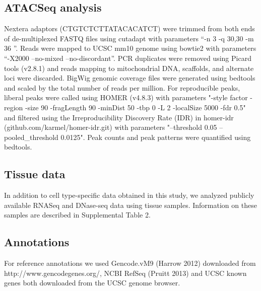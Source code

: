 \subsection{ATACSeq analysis}
Nextera adaptors (CTGTCTCTTATACACATCT) were trimmed from both ends of de-multiplexed FASTQ files using cutadapt with parameters “-n 3 -q 30,30 -m 36 ”. Reads were mapped to UCSC mm10 genome using bowtie2 with parameters “-X2000 --no-mixed --no-discordant”. PCR duplicates were removed using Picard tools (v2.8.1) and reads mapping to mitochondrial DNA, scaffolds, and alternate loci were discarded. BigWig genomic coverage files were generated using bedtools and scaled by the total number of reads per million. For reproducible peaks, liberal peaks were called using HOMER (v4.8.3) with parameters "-style factor -region -size 90 -fragLength 90 -minDist 50 -tbp 0 -L 2 -localSize 5000 -fdr 0.5" and filtered using the Irreproducibility Discovery Rate (IDR) in homer-idr (github.com/karmel/homer-idr.git) with parameters "--threshold 0.05 --pooled_threshold 0.0125". Peak counts and peak patterns were quantified using bedtools.

\subsection{Tissue data}
In addition to cell type-specific data obtained in this study, we analyzed publicly available RNASeq and DNase-seq data using tissue samples. Information on these samples are described in Supplemental Table 2.

\subsection{Annotations}
For reference annotations we used Gencode.vM9 (Harrow 2012) downloaded from http://www.gencodegenes.org/, NCBI RefSeq (Pruitt 2013) and UCSC known genes both downloaded from the UCSC genome browser.

